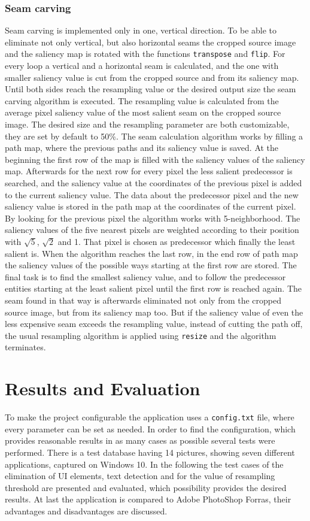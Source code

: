 \documentclass[draft,final]{vutinfth} %
\begin{document}
	\subsection{Seam carving}
	Seam carving is implemented only in one, vertical direction. 
	To be able to eliminate not only vertical, but also horizontal seams the cropped source image and the saliency map is rotated with the functions \texttt{transpose} and \texttt{flip}.
	For every loop a vertical and a horizontal seam is calculated, and the one with smaller saliency value is cut from the cropped source and from its saliency map.
	Until both sides reach the resampling value or the desired output size the seam carving algorithm is executed.
	The resampling value is calculated from the average pixel saliency value of the most salient seam on the cropped source image.
	The desired size and the resampling parameter are both customizable, they are set by default to 50\%. 
	The seam calculation algorithm works by filling a path map, where the previous paths and its saliency value is saved.
	At the beginning the first row of the map is filled with the saliency values of the saliency map.
	Afterwards for the next row for every pixel the less salient predecessor is searched, and the saliency value at the coordinates of the previous pixel is added to the current saliency value.
	The data about the predecessor pixel and the new saliency value is stored in the path map at the coordinates of the current pixel.
	By looking for the previous pixel the algorithm works with 5-neighborhood. 
	The saliency values of the five nearest pixels are weighted according to their position with $\sqrt{5}$, $\sqrt{2}$ and 1.
	That pixel is chosen as predecessor which finally the least salient is.
	When the algorithm reaches the last row, in the end row of path map the saliency values of the possible ways starting at the first row are stored.
	The final task is to find the smallest saliency value, and to follow the predecessor entities starting at the least salient pixel until the first row is reached again.
	The seam found in that way is afterwards eliminated not only from the cropped source image, but from its saliency map too.
	But if the saliency value of even the less expensive seam exceeds the resampling value, instead of cutting the path off, the usual resampling algorithm is applied using \texttt{resize} and the algorithm terminates.  
	
	\chapter{Results and Evaluation}
	To make the project configurable the application uses a \texttt{config.txt} file, where every parameter can be set as needed.
	In order to find the configuration, which provides reasonable results in as many cases as possible several tests were performed.
	There is a test database having 14 pictures, showing seven different applications, captured on Windows 10.
	In the following the test cases of the elimination of UI elements, text detection and for the value of resampling threshold are presented and evaluated, which possibility provides the desired results.
	At last the application is compared to Adobe PhotoShop Forras, their advantages and disadvantages are discussed.
\end{document}
